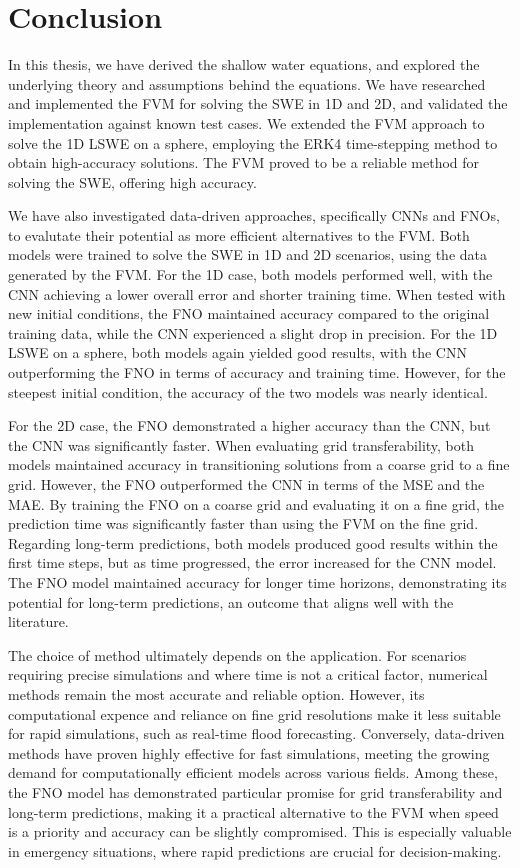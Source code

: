\chapter{Conclusion}\label{ch:conclusion}
In this thesis, we have derived the shallow water equations, and explored the underlying theory and assumptions behind the equations.
We have researched and implemented the FVM for solving the SWE in 1D and 2D, and validated the implementation against known test cases.
We extended the FVM approach to solve the 1D LSWE on a sphere, employing the ERK4 time-stepping method to obtain high-accuracy solutions.
The FVM proved to be a reliable method for solving the SWE, offering high accuracy.

We have also investigated data-driven approaches, specifically CNNs and FNOs, to evalutate their potential as more efficient alternatives to the FVM.
Both models were trained to solve the SWE in 1D and 2D scenarios, using the data generated by the FVM.
For the 1D case, both models performed well, with the CNN achieving a lower overall error and shorter training time.
When tested with new initial conditions, the FNO maintained accuracy compared to the original training data, while the CNN experienced a slight drop in precision.
For the 1D LSWE on a sphere, both models again yielded good results, with the CNN outperforming the FNO in terms of accuracy and training time.
However, for the steepest initial condition, the accuracy of the two models was nearly identical.

For the 2D case, the FNO demonstrated a higher accuracy than the CNN, but the CNN was significantly faster.
When evaluating grid transferability, both models maintained accuracy in transitioning solutions from a coarse grid to a fine grid.
However, the FNO outperformed the CNN in terms of the MSE and the MAE.
By training the FNO on a coarse grid and evaluating it on a fine grid, the prediction time was significantly faster than using the FVM on the fine grid. %
Regarding long-term predictions, both models produced good results within the first time steps, but as time progressed, the error increased for the CNN model.
The FNO model maintained accuracy for longer time horizons, demonstrating its potential for long-term predictions, an outcome that aligns well with the literature.

The choice of method ultimately depends on the application.
For scenarios requiring precise simulations and where time is not a critical factor, numerical methods remain the most accurate and reliable option.
However, its computational expence and reliance on fine grid resolutions make it less suitable for rapid simulations, such as real-time flood forecasting.
Conversely, data-driven methods have proven highly effective for fast simulations, meeting the growing demand for computationally efficient models across various fields.
Among these, the FNO model has demonstrated particular promise for grid transferability and long-term predictions, making it a practical alternative to the FVM when speed is a priority and accuracy can be slightly compromised.
This is especially valuable in emergency situations, where rapid predictions are crucial for decision-making.

